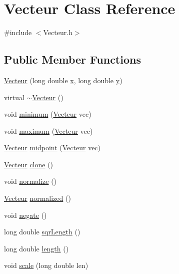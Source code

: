 \hypertarget{classVecteur}{}\section{Vecteur Class Reference}
\label{classVecteur}


{\ttfamily \#include $<$Vecteur.\+h$>$}

\subsection*{Public Member Functions}
\begin{DoxyCompactItemize}
\item 
\mbox{\hyperlink{classVecteur_ad3074804c5da6664ce7a197562f20d26}{Vecteur}} (long double \mbox{\hyperlink{classVecteur_a074a757613d59358146305d17f9234e5}{x}}, long double \mbox{\hyperlink{classVecteur_ab68457b2f57879f056bb8c354338f5b9}{y}})
\item 
virtual \mbox{\hyperlink{classVecteur_a60c65b39413a03afd489d547d2bbe023}{$\sim$\+Vecteur}} ()
\item 
void \mbox{\hyperlink{classVecteur_ad7b877d84e920d435e80e1b91ff7f991}{minimum}} (\mbox{\hyperlink{classVecteur}{Vecteur}} vec)
\item 
void \mbox{\hyperlink{classVecteur_acdb9760e842eeea4c2dc285713f97bf2}{maximum}} (\mbox{\hyperlink{classVecteur}{Vecteur}} vec)
\item 
\mbox{\hyperlink{classVecteur}{Vecteur}} \mbox{\hyperlink{classVecteur_a02fe1ecb17ffe58c304b38d9ab6239a5}{midpoint}} (\mbox{\hyperlink{classVecteur}{Vecteur}} vec)
\item 
\mbox{\hyperlink{classVecteur}{Vecteur}} \mbox{\hyperlink{classVecteur_a5594a323b7dbb6a0ac502961a915c2ec}{clone}} ()
\item 
void \mbox{\hyperlink{classVecteur_ad4f3a4d85a0df796e16463bcde4d6390}{normalize}} ()
\item 
\mbox{\hyperlink{classVecteur}{Vecteur}} \mbox{\hyperlink{classVecteur_ac8918bb8adab4452741c787c0fb805df}{normalized}} ()
\item 
void \mbox{\hyperlink{classVecteur_a2300d5ef9a10b1e22a319b10137498ba}{negate}} ()
\item 
long double \mbox{\hyperlink{classVecteur_a02ee49c86e1940ffb520d0c2dba5b81b}{sqr\+Length}} ()
\item 
long double \mbox{\hyperlink{classVecteur_a2679bc92e61a0ac2ddffed113eb2b00d}{length}} ()
\item 
void \mbox{\hyperlink{classVecteur_ab4de9caff88ac8a622b6255ca58fb79c}{scale}} (long double len)

\end{DoxyCompactItemize}
